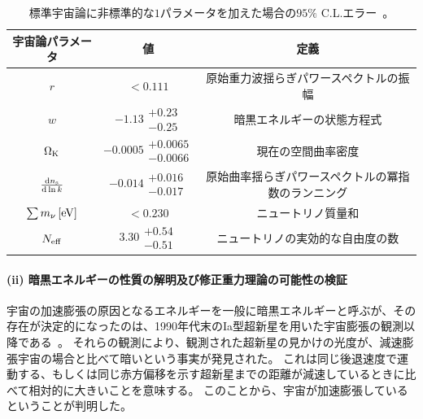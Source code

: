 \begin{center}
\begin{table}[t]
\caption{
標準宇宙論に非標準的な$1$パラメータを加えた場合の$95\%$ C.L.エラー~\citep{Ade:2013zuv}。
}
\begin{center}
\begin{tabular}{ccc} \hline \hline 
宇宙論パラメータ & 値 & 定義 \\ 
\hline 
$r$ & $<0.111$ & 原始重力波揺らぎパワースペクトルの振幅\\
$w$ & $-1.13
   \begin{array}{l}
      +0.23 \\
      -0.25
    \end{array}$
& 暗黒エネルギーの状態方程式\\
$\Omega_{\rm K}$ & $-0.0005
   \begin{array}{l}
      +0.0065 \\
      -0.0066
    \end{array}$
& 現在の空間曲率密度\\
$\frac{{\rm d}n_{\rm s}}{{\rm d}\ln k}$ & $-0.014
   \begin{array}{l}
      +0.016 \\
      -0.017
    \end{array}$
& 原始曲率揺らぎパワースペクトルの冪指数のランニング \\
$\sum m_\nu\,[{\rm eV}]$ & $<0.230$ & ニュートリノ質量和 \\
$N_{\rm eff}$ & $3.30
   \begin{array}{l}
      +0.54 \\
      -0.51
    \end{array}$
& ニュートリノの実効的な自由度の数\\
\hline
\hline 
\end{tabular}
\end{center}
\label{cosmological parameters2}
\end{table} 
\end{center}
\paragraph{(ii) 暗黒エネルギーの性質の解明及び修正重力理論の可能性の検証}
%
宇宙の加速膨張の原因となるエネルギーを一般に暗黒エネルギーと呼ぶが、その存在が決定的になったのは、1990年代末のIa型超新星を用いた宇宙膨張の観測以降である~\citep{Riess:1998cb,Perlmutter:1998np}。
それらの観測により、観測された超新星の見かけの光度が、減速膨張宇宙の場合と比べて暗いという事実が発見された。
これは同じ後退速度で運動する、もしくは同じ赤方偏移を示す超新星までの距離が減速しているときに比べて相対的に大きいことを意味する。
このことから、宇宙が加速膨張しているということが判明した。

